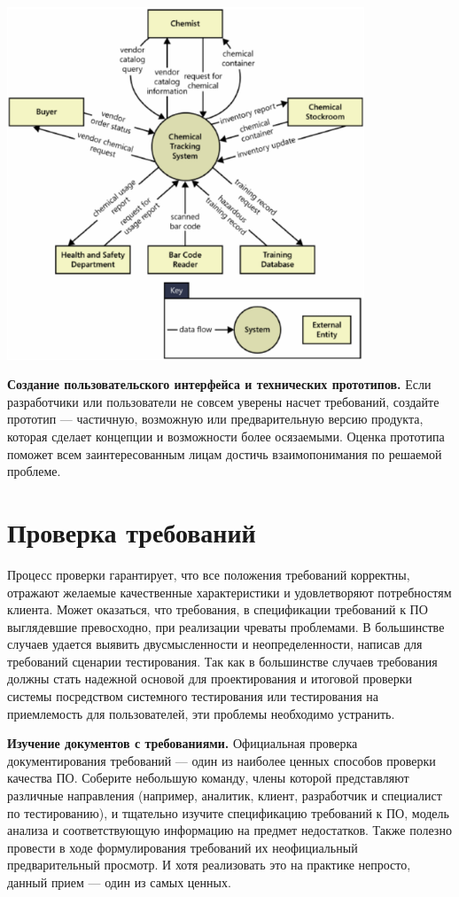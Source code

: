 \documentclass{../../text-style}
\begin{document}
\begin{center}
    \includegraphics[width=0.8\textwidth]{contextDiagram.png}
\end{center}

\textbf{Создание пользовательского интерфейса и технических прототипов.} Если разработчики или пользователи не совсем уверены насчет требований, создайте прототип --- частичную, возможную или предварительную версию продукта, которая сделает концепции и возможности более осязаемыми. Оценка прототипа поможет всем заинтересованным лицам достичь взаимопонимания по решаемой проблеме.

\section{Проверка требований}

Процесс проверки гарантирует, что все положения требований корректны, отражают желаемые качественные характеристики и удовлетворяют потребностям клиента. Может оказаться, что требования, в спецификации требований к ПО выглядевшие превосходно, при реализации чреваты проблемами. В большинстве случаев удается выявить двусмысленности и неопределенности, написав для требований сценарии тестирования. Так как в большинстве случаев требования должны стать надежной основой для проектирования и итоговой проверки системы посредством системного тестирования или тестирования на приемлемость для пользователей, эти проблемы необходимо устранить.

\textbf{Изучение документов с требованиями.} Официальная проверка документирования требований --- один из наиболее ценных способов проверки качества ПО. Соберите небольшую команду, члены которой представляют различные направления (например, аналитик, клиент, разработчик и специалист по тестированию), и тщательно изучите спецификацию требований к ПО, модель анализа и соответствующую информацию на предмет недостатков. Также полезно провести в ходе формулирования требований их неофициальный предварительный просмотр. И хотя реализовать это на практике непросто, данный прием --- один из самых ценных.
\end{document}
